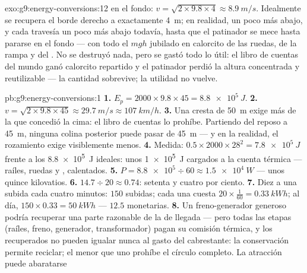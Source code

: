 \begin{solution}{exo:g9:energy-conversions:12}
 en el fondo: $v = \sqrt{2 \times 9.8 \times 4} \approx
\qty{8.9}{m/s}$. Idealmente se recupera el borde derecho a exactamente
\qty{4}{m}; en realidad, un poco más abajo, y cada travesía un poco más
abajo todavía, hasta que el patinador se mece hasta pararse en el fondo
--- con todo el $m g h$ jubilado en calorcito de las ruedas, de la rampa
y del . No se destruyó nada, pero se gastó todo lo útil: el
libro de cuentas del mundo ganó calorcito repartido y el patinador
perdió la altura concentrada y reutilizable --- la cantidad sobrevive;
la utilidad no vuelve.
\end{solution}

\begin{solution}{pb:g9:energy-conversions:1}
\textbf{1.} $E_p = 2000 \times 9.8 \times 45 = \qty{8.8e5}{J}$.
\textbf{2.} $v = \sqrt{2 \times 9.8 \times 45} \approx \qty{29.7}{m/s}
\approx \qty{107}{km/h}$.
\textbf{3.} Una cresta de \qty{50}{m} exige más  de la que
concedió la cima: el libro de cuentas lo prohíbe. Partiendo del reposo
a \qty{45}{m}, ninguna colina posterior puede pasar de \qty{45}{m} ---
y en la realidad, el rozamiento exige visiblemente menos.
\textbf{4.} Medida: $0.5 \times 2000 \times 28^2 = \qty{7.8e5}{J}$
frente a los \qty{8.8e5}{J} ideales: unos \qty{1e5}{J} cargados a la
cuenta térmica --- raíles, ruedas y , calentados.
\textbf{5.} $P = \num{8.8e5} \div 60 \approx \qty{1.5e4}{W}$ --- unos
quince kilovatios.
\textbf{6.} $14.7 \div 20 \approx 0.74$: setenta y cuatro por ciento.
\textbf{7.} Diez  a una subida cada cuatro minutos: $150$
subidas; cada una cuesta $20 \times \tfrac{1}{60} = \qty{0.33}{kWh}$;
al día, $150 \times 0.33 = \qty{50}{kWh}$ --- $12.5$
 monetarias.
\textbf{8.} Un freno-generador generoso podría recuperar una parte
razonable de la  de llegada --- pero todas las
etapas (raíles, freno, generador, transformador) pagan su comisión
térmica, y los  recuperados no pueden igualar nunca al gasto
del cabrestante: la conservación permite reciclar; el  menor
que uno prohíbe el círculo completo. La atracción puede abaratarse

\end{solution}
